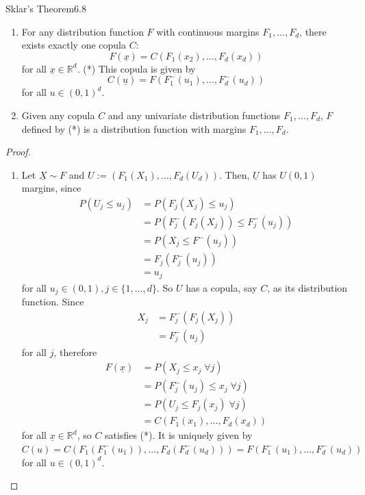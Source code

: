 \documentclass{article}
\newcommand{\R}{\mathbb{R}}
\begin{document}
	\begin{mythm}{Sklar's Theorem}{6.8}
		\begin{enumerate}
			\item For any distribution function $F$ with continuous margins $F_1, \dots, F_d$, there exists exactly one copula $C$: $$F(\underline{x})=C(F_1(x_2), \dots, F_d(x_d))$$ for all $\underline{x}\in\R^d$. (*) This copula is given by $$C(\underline{u})=F(F_1^-(u_1), \dots, F_d^-(u_d))$$ for all $u\in(0, 1)^d$.
			
			\item Given any copula $C$ and any univariate distribution functions $F_1, \dots, F_d$, $F$ defined by (*) is a distribution function with margins $F_1, \dots, F_d$.
		\end{enumerate}
		
		\begin{proof}~
			\begin{enumerate}
				\item Let $\underline{X}\sim F$ and $U:=(F_1(X_1), \dots, F_d(U_d))$. Then, $\underline{U}$ has $U(0, 1)$ margins, since
				\begin{align*}
					P(U_j\leq u_j)&=P(F_j(X_j)\leq u_j)\\
					&=P(F_j^-(F_j(X_j))\leq F_j^-(u_j))\\
					&=P(X_j\leq F^-(u_j))\\
					&=F_j(F_j^-(u_j))\\
					&=u_j
				\end{align*}
				for all $u_j\in(0, 1), j\in\{1, \dots, d\}$. So $U$ has a copula, say $C$, as its distribution function. Since
				\begin{align*}
					X_j&=F_j^-(F_j(X_j))\\
					&=F_j^-(u_j)
				\end{align*}
				for all $j$, therefore
				\begin{align*}
					F(\underline{x})&=P(X_j\leq x_j\;\forall j)\\
					&=P(F_j^-(u_j)\leq x_j\;\forall j)\\
					&=P(U_j\leq F_j(x_j)\;\forall j)\\
					&=C(F_1(x_1), \dots, F_d(x_d))
				\end{align*}
				for all $\underline{x}\in\R^d$, so $C$ satisfies (*). It is uniquely given by $C(u)=C(F_1(F_1^-(u_1)), \dots, F_d(F_d^-(u_d)))=F(F_1^-(u_1), \dots, F_d^-(u_d))$ for all $u\in(0, 1)^d$.
				

\end{enumerate}
\end{proof}
\end{mythm}
\end{document}
